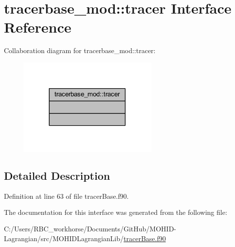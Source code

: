 \hypertarget{interfacetracerbase__mod_1_1tracer}{}\section{tracerbase\+\_\+mod\+:\+:tracer Interface Reference}
\label{interfacetracerbase__mod_1_1tracer}


Collaboration diagram for tracerbase\+\_\+mod\+:\+:tracer\+:\nopagebreak
\begin{figure}[H]
\begin{center}
\leavevmode
\includegraphics[width=197pt]{interfacetracerbase__mod_1_1tracer__coll__graph}
\end{center}
\end{figure}


\subsection{Detailed Description}


Definition at line 63 of file tracer\+Base.\+f90.



The documentation for this interface was generated from the following file\+:\begin{DoxyCompactItemize}
\item 
C\+:/\+Users/\+R\+B\+C\+\_\+workhorse/\+Documents/\+Git\+Hub/\+M\+O\+H\+I\+D-\/\+Lagrangian/src/\+M\+O\+H\+I\+D\+Lagrangian\+Lib/\mbox{\hyperlink{tracer_base_8f90}{tracer\+Base.\+f90}}\end{DoxyCompactItemize}
